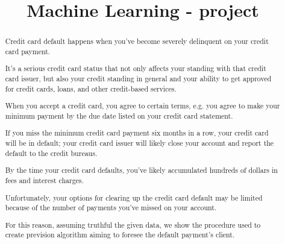 \documentclass[11pt]{article}
\title{Machine Learning - project}
\date{}
\begin{document}
\maketitle
\begin{abstract}
	Credit card default happens when you've become severely delinquent on your credit card payment.

  It's a serious credit card status that not only affects your standing with that credit card issuer, but also your credit standing in general and your ability to get approved for credit cards, loans, and other credit-based services.
	
	When you accept a credit card, you agree to certain terms, e.g. you agree to make your minimum payment by the due date listed on your credit card statement.
	
	 If you miss the minimum credit card payment six months in a row, your credit card will be in default; your credit card issuer will likely close your account and report the default to the credit bureaus.
	
	By the time your credit card defaults, you've likely accumulated hundreds of dollars in fees and interest charges. 
	
	
    Unfortunately, your options for clearing up the credit card default may be limited because of the number of payments you've missed on your account. 
    
    For this reason, assuming truthful the given data, we show the procedure used to create prevision algorithm aiming to foresee the default payment's client.
    
    
\end{abstract}
\end{document}
